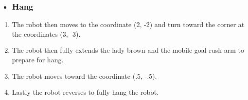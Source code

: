 \begin{itemize}
    \item \subsubsection{Hang}
\end{itemize}
\begin{enumerate}
    \item The robot then moves to the coordinate (2, -2) and turn toward the corner at the coordinates (3, -3).
    \item The robot then fully extends the lady brown and the mobile goal rush arm to prepare for hang.
    \item  The robot moves toward the coordinate (.5, -.5).
    \item  Lastly the robot reverses to fully hang the robot.
\end{enumerate}